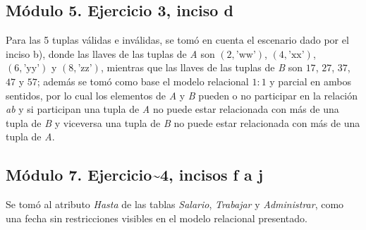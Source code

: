 \subsection*{Módulo 5. Ejercicio 3, inciso d}

Para las 5 tuplas válidas e inválidas, se tomó en cuenta el escenario
dado por el inciso b), donde las llaves de las tuplas de
\textit{A} son $(2,\text{'ww'})$, $(4,\text{'xx'})$,
$(6,\text{'yy'})$ y $(8,\text{'zz'})$, mientras que las llaves de
las tuplas de \textit{B} son $17$, $27$, $37$, $47$ y $57$;
además se tomó como base el modelo relacional $1:1$ y parcial en
ambos sentidos, por lo cual los elementos de \textit{A} y
\textit{B} pueden o no participar en la relación \textit{ab} y si
participan una tupla de \textit{A} no puede estar relacionada con
más de una tupla de \textit{B} y viceversa una tupla de \textit{B}
no puede estar relacionada con más de una tupla de \textit{A}.

\subsection*{Módulo 7. Ejercicio\textasciitilde 4, incisos f a j}

Se tomó al atributo \textit{Hasta} de las tablas \textit{Salario},
\textit{Trabajar} y \textit{Administrar}, como una fecha sin
restricciones visibles en el modelo relacional presentado.

